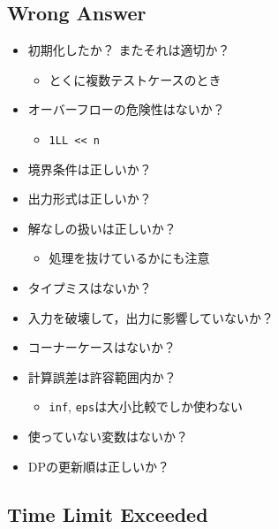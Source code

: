 \documentclass{jsarticle}
\begin{document}

\vbox{}\subsection*{Wrong Answer}

\begin{itemize}
\item 初期化したか？ またそれは適切か？
  \begin{itemize}
  \item とくに複数テストケースのとき
  \end{itemize}
\item オーバーフローの危険性はないか？
  \begin{itemize}
  \item \verb|1LL << n|
  \end{itemize}
\item 境界条件は正しいか？
\item 出力形式は正しいか？
\item 解なしの扱いは正しいか？
  \begin{itemize}
  \item 処理を抜けているかにも注意
  \end{itemize}
\item タイプミスはないか？
\item 入力を破壊して，出力に影響していないか？
\item コーナーケースはないか？
\item 計算誤差は許容範囲内か？
  \begin{itemize}
  \item \verb|inf|, \verb|eps|は大小比較でしか使わない
  \end{itemize}
\item 使っていない変数はないか？
\item DPの更新順は正しいか？
\end{itemize}

\subsection*{Time Limit Exceeded}
\end{document}
